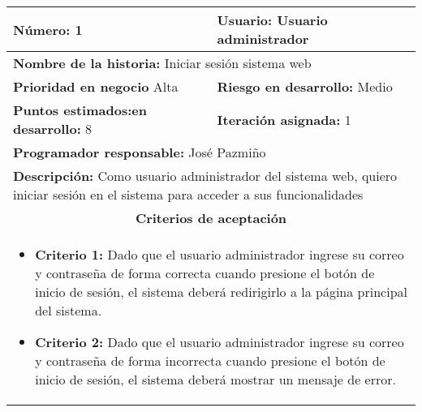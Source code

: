 \begin{longtable}{|p{6.7cm}|p{6.7cm}|}
    \textbf{Número:} 1                                  & \textbf{Usuario:} Usuario administrador                                                                          \\
    \hline
    \multicolumn{2}{|l|}{\textbf{Nombre de la historia:} Iniciar sesión sistema web}                                                                                       \\
    \hline
    \textbf{Prioridad en negocio}  Alta                 & \textbf{Riesgo en desarrollo:} Medio                                                                             \\
    \hline
    \textbf{\textbf{Puntos estimados:}en desarrollo:} 8 & \textbf{Iteración asignada:} 1                                                                                   \\
    \hline
    \multicolumn{2}{|l|}{\textbf{Programador responsable:} José Pazmiño }                                                                                                  \\
    \hline
    \multicolumn{2}{|p{13.4cm}|}{\textbf{Descripción:} Como usuario administrador del sistema web, quiero iniciar sesión en el sistema para acceder a sus funcionalidades} \\
    \hline
    \multicolumn{2}{|c|}{\textbf{Criterios de aceptación}}                                                                                                                 \\
    \hline
    \multicolumn{2}{|p{13.4cm}|}{
    \begin{itemize}[label={},leftmargin=*, nosep]
        \item \textbf{Criterio 1:} Dado que el usuario administrador ingrese su correo y contraseña de forma correcta cuando presione el botón de inicio de sesión, el sistema deberá redirigirlo a la página principal del sistema.
        \item \textbf{Criterio 2:} Dado que el usuario administrador ingrese su correo y contraseña de forma incorrecta cuando presione el botón de inicio de sesión, el sistema deberá mostrar un mensaje de error.
    \end{itemize}
    }                                                                                                                                                                      \\
\end{longtable}




